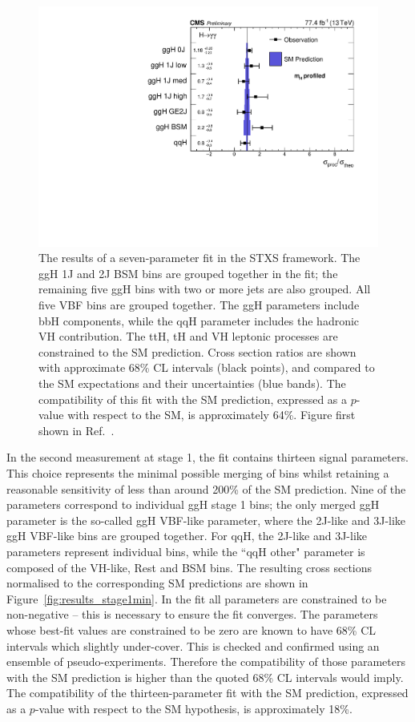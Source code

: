 \begin{figure}[hptb]
  \centering
  \includegraphics[width=\textwidth]{Figures/Results/Stage1.pdf}
  \caption[Results of a seven-parameter fit in the STXS framework.]
  {
    The results of a seven-parameter fit in the STXS framework. 
    The ggH 1J and 2J BSM bins are grouped together in the fit; 
    the remaining five ggH bins with two or more jets are also grouped. 
    All five VBF bins are grouped together. 
    The ggH parameters include bbH components, 
    while the qqH parameter includes the hadronic VH contribution. 
    The ttH, tH and VH leptonic processes are constrained to the SM prediction. 
    Cross section ratios are shown with approximate 68\% CL intervals (black points), 
    and compared to the SM expectations and their uncertainties (blue bands).
    The compatibility of this fit with the SM prediction, 
    expressed as a $p$-value with respect to the SM, is approximately 64\%.
    Figure first shown in Ref.~\cite{HIG-18-029}.
  }
  \label{fig:results_stage1}
\end{figure}

In the second measurement at stage 1, the fit contains thirteen signal parameters.
This choice represents the minimal possible merging of bins 
whilst retaining a reasonable sensitivity of less than around 200\% of the SM prediction.
Nine of the parameters correspond to individual ggH stage 1 bins; 
the only merged ggH parameter is the so-called ggH VBF-like parameter, 
where the 2J-like and 3J-like ggH VBF-like bins are grouped together.
For qqH, the 2J-like and 3J-like parameters represent individual bins, 
while the ``qqH other" parameter is composed of the VH-like, Rest and BSM bins.
The resulting cross sections normalised to the corresponding SM predictions 
are shown in Figure~\ref{fig:results_stage1min}.
In the fit all parameters are constrained to be non-negative -- this is necessary 
to ensure the fit converges.
The parameters whose best-fit values are constrained to be zero are known to have 68\% CL intervals 
which slightly under-cover. 
This is checked and confirmed using an ensemble of pseudo-experiments.
Therefore the compatibility of those parameters with the SM prediction is higher than 
the quoted 68\% CL intervals would imply.
The compatibility of the thirteen-parameter fit with the SM prediction, 
expressed as a $p$-value with respect to the SM hypothesis, is approximately 18\%.

